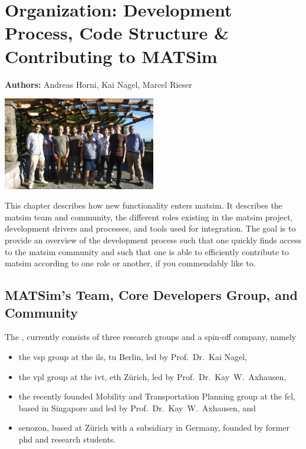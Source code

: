 \chapter{Organization: Development Process, Code Structure \& Contributing to MATSim}
\label{ch:developmentprocess}

\hfill \textbf{Authors:} Andreas Horni, Kai Nagel, Marcel Rieser

\begin{center} \includegraphics[width=0.5\textwidth, angle=0]{extending/figures/ConceptualMeetingVillaHatt.png} \end{center}

This chapter describes how new functionality enters \gls{matsim}. It describes the \gls{matsim} team and community, the different roles existing in the \gls{matsim} project, development drivers and processes, and tools used for integration. The goal is to 
provide an overview of the development process such that 
one quickly finds access to the \gls{matsim} community and such that 
one is able to efficiently contribute to \gls{matsim} according to one role or another, if you commendably like to.

\section{MATSim's Team, Core Developers Group, and Community}
The , 
currently consists of three research groups and a spin-off company, namely 
\begin{itemize}\styleItemize
\item the \gls{vsp} group at the \gls{ils}, \gls{tu} Berlin, led by Prof.~Dr.~Kai Nagel,
\item the \gls{vpl} group at the \gls{ivt}, \gls{eth} Zürich, led by Prof.~Dr.~Kay~W.~Axhausen, 
\item the recently founded Mobility and Transportation Planning group at the \gls{fcl}, based in Singapore and led by Prof.~Dr.~Kay~W.~Axhausen, and 
\item \gls{senozon}, based at Zürich with a subsidiary in Germany, founded by former \gls{phd} and research students. 
\end{itemize}

